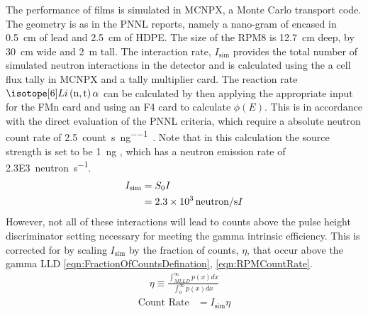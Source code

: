 The performance of films is simulated in MCNPX, a Monte Carlo transport code\cite{pelowitz_mcnpx_????}.
The geometry is as in the PNNL reports, namely a nano-gram of   encased in \SI{0.5}{\cm} of lead and \SI{2.5}{\cm} of HDPE. 
The size of the RPM8 is \SI{12.7}{\cm} deep, by \SI{30}{\cm} wide and \SI{2}{\m} tall.
The interaction rate, $I_{\text{sim}}$ provides the total number of simulated neutron interactions in the detector and is calculated using the a cell flux tally in MCNPX and a tally multiplier card.
The reaction rate $\iso[6]{Li}\left(\text{n},\text{t}\right)\alpha$ can be calculated by then applying the appropriate input for the FMn card and using an F4 card to calculate $\phi(E)$.
This is in accordance with the direct evaluation of the PNNL criteria, which require a absolute neutron count rate of \SI{2.5}{count\per\second\per\nano\gram{}}.
Note that in this calculation the source strength is set to be \SI{1}{\nano\gram} , which has a neutron emission rate of \SI{2.3E3}{neutron\per\second}.
\begin{align}
  \label{eqn:RPM8InteractionRate}
  I_{\text{sim}} &= S_0 I \\
  &= \SI{2.3E3}{neutron\per\second} I
\end{align}
However, not all of these interactions will lead to counts above the pulse height discriminator setting necessary for meeting the gamma intrinsic efficiency.
This is corrected for by scaling $I_{\text{sim}}$ by the fraction of counts, $\eta$, that occur above the gamma LLD \eqref{eqn:FractionOfCountsDefination}, \eqref{eqn:RPMCountRate}.
\begin{align}
  \label{eqn:FractionOfCountsDefination}
  \eta \equiv \frac{\int_{MLLD}^\infty p(x)dx}{\int_0^\infty p(x)dx}
\end{align}
\begin{align}
 \label{eqn:RPMCountRate}
 \text{Count Rate} &= I_{\text{sim}} \eta
\end{align}
 
